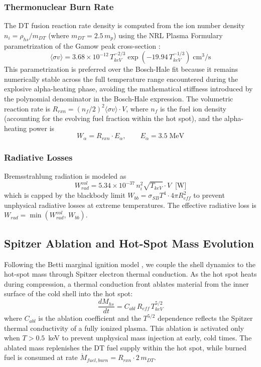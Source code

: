 \documentclass[conference]{IEEEtran}
\begin{document}
\subsubsection{Thermonuclear Burn Rate}
The DT fusion reaction rate density is computed from the ion number density $n_i = \rho_{hs}/m_{DT}$ (where $m_{DT} = 2.5\,m_p$) using the NRL Plasma Formulary parametrization of the Gamow peak cross-section \cite{nrl2019}:
\begin{equation}
\langle\sigma v\rangle = 3.68 \times 10^{-12} \, T_{keV}^{-2/3} \exp\!\left(-19.94 \, T_{keV}^{-1/3}\right) \;\text{cm}^3/\text{s}
\label{eq:sigmav}
\end{equation}
This parametrization is preferred over the Bosch-Hale fit \cite{bosch1992} because it remains numerically stable across the full temperature range encountered during the explosive alpha-heating phase, avoiding the mathematical stiffness introduced by the polynomial denominator in the Bosch-Hale expression.  The volumetric reaction rate is $R_{rxn} = (n_f/2)^2 \langle\sigma v\rangle \cdot V$, where $n_f$ is the fuel ion density (accounting for the evolving fuel fraction within the hot spot), and the alpha-heating power is
\begin{equation}
W_\alpha = R_{rxn} \cdot E_\alpha, \qquad E_\alpha = 3.5\;\text{MeV}
\label{eq:alpha}
\end{equation}

\subsubsection{Radiative Losses}
Bremsstrahlung radiation is modeled as
\begin{equation}
W_{rad}^{vol} = 5.34 \times 10^{-37} \, n_i^2 \sqrt{T_{keV}} \cdot V \;\;\text{[W]}
\label{eq:bremsstrahlung}
\end{equation}
which is capped by the blackbody limit $W_{bb} = \sigma_{SB} T^4 \cdot 4\pi R_{eff}^2$ to prevent unphysical radiative losses at extreme temperatures.  The effective radiative loss is $W_{rad} = \min(W_{rad}^{vol},\, W_{bb})$.

\subsection{Spitzer Ablation and Hot-Spot Mass Evolution}

Following the Betti marginal ignition model \cite{betti2002}, we couple the shell dynamics to the hot-spot mass through Spitzer electron thermal conduction.  As the hot spot heats during compression, a thermal conduction front ablates material from the inner surface of the cold shell into the hot spot:
\begin{equation}
\frac{dM_{hs}}{dt} = C_{abl} \, R_{eff} \, T_{keV}^{5/2}
\label{eq:ablation}
\end{equation}
where $C_{abl}$ is the ablation coefficient and the $T^{5/2}$ dependence reflects the Spitzer thermal conductivity of a fully ionized plasma.  This ablation is activated only when $T > 0.5$~keV to prevent unphysical mass injection at early, cold times.  The ablated mass replenishes the DT fuel supply within the hot spot, while burned fuel is consumed at rate $\dot{M}_{fuel,burn} = R_{rxn} \cdot 2\,m_{DT}$.
\end{document}
